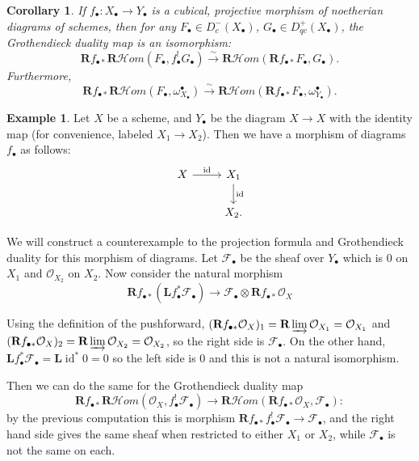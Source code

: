 \documentclass{amsart}
\newtheorem{cor}[theorem]{Corollary}
\theoremstyle{definition}
\newtheorem{example}[theorem]{Example}
\newcommand{\cHom}{\mathcal{H} \textit{om}}
\DeclareMathOperator{\id}{id}
\newcommand{\FF}{\mathscr{F}}
\newcommand{\bL}{\textbf{L}}
\newcommand{\OO}{\mathcal{O}}
\newcommand{\bR}{\textbf{R}}
\begin{document}
\begin{cor}
	\label{cor:cubicalgrothdual}
	If $f_\bullet : X_\bullet \rightarrow Y_\bullet$ is a cubical, projective morphism of noetherian diagrams of schemes, then for any $F_\bullet \in D_{c}^-(X_\bullet)$, $G_\bullet \in D_{qc}^+(X_\bullet)$, the Grothendieck duality map is an isomorphism:
	\[
		\bR f_{\bullet *} \bR \cHom(F_\bullet, f_\bullet^! G_\bullet) \xrightarrow{\sim} \bR \cHom(\bR f_{\bullet *} F_\bullet, G_\bullet).
	\]
	Furthermore,
	\[
		\bR f_{\bullet *} \bR \cHom(F_\bullet, \omega_{X_\bullet}^\bullet) \xrightarrow{\sim} \bR \cHom(\bR f_{\bullet *} F_\bullet, \omega_{Y_\bullet}^\bullet).
	\]
\end{cor}

\begin{example}
	Let $X$ be a scheme, and $Y_\bullet$ be the diagram $X \rightarrow X$ with the identity map (for convenience, labeled $X_1 \rightarrow X_2$).
	Then we have a morphism of diagrams $f_\bullet$ as follows:
	\[
	\begin{tikzcd}
		X \arrow{r}{\id} & X_1 \arrow{d}{\id} \\
		& X_2.
	\end{tikzcd}
	\]
	
	We will construct a counterexample to the projection formula and Grothendieck duality for this morphism of diagrams.
	Let $\FF_\bullet$ be the sheaf over $Y_\bullet$ which is 0 on $X_1$ and $\OO_{X_2}$ on $X_2$.
	Now consider the natural morphism
	\[
		\bR f_{\bullet *} (\bL f_\bullet^* \FF_\bullet) \rightarrow \FF_\bullet \otimes \bR f_{\bullet *} \OO_X
	\]
	
	Using the definition of the pushforward, $(\bR f_{\bullet *} \OO_X)_1 = \bR \varinjlim \OO_{X_1} = \OO_{X_1}$ and $(\bR f_{\bullet *} \OO_X)_2 = \bR \varinjlim \OO_{X_2} = \OO_{X_2}$, so the right side is $\FF_\bullet$.
	On the other hand, $\bL f_\bullet^* \FF_\bullet = \bL \id^* 0 = 0$ so the left side is 0 and this is not a natural isomorphism.
	
	Then we can do the same for the Grothendieck duality map
	\[
		\bR f_{\bullet *} \bR \cHom(\OO_X, f_\bullet^! \FF_\bullet) \rightarrow \bR \cHom(\bR f_{\bullet *} \OO_X , \FF_\bullet):
	\]
	by the previous computation this is morphism $\bR f_{\bullet *} f_\bullet^! \FF_\bullet \rightarrow \FF_\bullet$, and the right hand side gives the same sheaf when restricted to either $X_1$ or $X_2$, while $\FF_\bullet$ is not the same on each.
\end{example}
\end{document}
